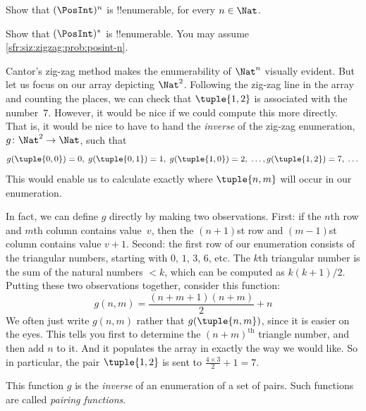 \begin{prob}\label{sfr:siz:zigzag:prob:posint-n}
Show that $(\PosInt)^n$ is !!{enumerable}, for every $n \in \Nat$.
\end{prob}

\begin{prob}\label{sfr:siz:zigzag:prob:posint-star}
  Show that $(\PosInt)^*$ is !!{enumerable}. You may assume \cref{sfr:siz:zigzag:prob:posint-n}.
\end{prob}






\begin{explain}
Cantor's zig-zag method makes the enumerability of $\Nat^n$ visually
evident. But let us focus on our array depicting $\Nat^2$. Following
the zig-zag line in the array and counting the places, we can check
that $\tuple{1,2}$ is associated with the number~$7$. However, it would
be nice if we could compute this more directly. That is, it would be
nice to have to hand the \emph{inverse} of the zig-zag enumeration,
$g\colon \Nat^2 \to \Nat$, such that
\[
g(\tuple{0,0}) = 0, \;
g(\tuple{0,1}) = 1, \;
g(\tuple{1,0}) = 2, \; \dots,  
g(\tuple{1,2}) = 7, \; \dots
\]
This would enable us to calculate exactly where $\tuple{n, m}$ will occur
in our enumeration. 

In fact, we can define $g$ directly by making two observations. First:
if the $n$th row and $m$th column contains value~$v$, then the
$(n+1)$st row and $(m-1)$st column contains value $v + 1$. Second: the
first row of our enumeration consists of the triangular numbers,
starting with $0$, $1$, $3$, $6$, etc. The $k$th triangular number is
the sum of the natural numbers $< k$, which can be computed as
$k(k+1)/2$. Putting these two observations together, consider this
function:
\[
  g(n,m) = \frac{(n+m+1)(n+m)}{2} + n
\]
We often just write $g(n, m)$ rather that $g(\tuple{n, m})$, since it
is easier on the eyes. This tells you first to determine the
$(n+m)^\text{th}$ triangle number, and then add $n$ to it. And
it populates the array in exactly the way we would like. So in
particular, the pair $\tuple{1, 2}$ is sent to $\frac{4 \times 3}{2} +
1 = 7$. 

This function $g$ is the \emph{inverse} of an enumeration of a set of
pairs. Such functions are called \emph{pairing functions}.
\end{explain}

